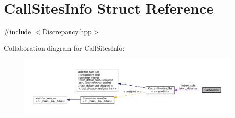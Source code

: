 \hypertarget{structCallSitesInfo}{}\section{Call\+Sites\+Info Struct Reference}
\label{structCallSitesInfo}


{\ttfamily \#include $<$Discrepancy.\+hpp$>$}



Collaboration diagram for Call\+Sites\+Info\+:
\nopagebreak
\begin{figure}[H]
\begin{center}
\leavevmode
\includegraphics[width=350pt]{de/db2/structCallSitesInfo__coll__graph}
\end{center}
\end{figure}
